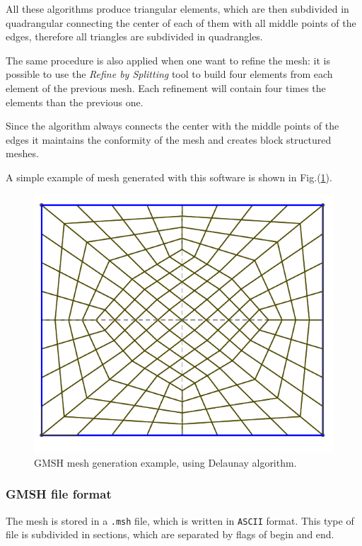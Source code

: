 All these algorithms produce triangular elements, which are then subdivided in quadrangular connecting the center of each of them with all middle points of the edges, therefore all triangles are subdivided in quadrangles.

The same procedure is also applied when one want to refine the mesh: it is possible to use the \textit{Refine by Splitting} tool to build four elements from each element of the previous mesh. Each refinement will contain four times the elements than the previous one.

Since the algorithm always connects the center with the middle points of the edges it maintains the conformity of the mesh and creates block structured meshes.

A simple example of mesh generated with this software is shown in Fig.(\ref{fig:simple_mesh}).

\begin{figure}
\centering
\includegraphics[scale=.6]{images/simple_mesh.pdf}
\caption{GMSH mesh generation example, using Delaunay algorithm.}
\label{fig:simple_mesh}
\end{figure}

\subsubsection{GMSH file format}\label{subsubsection:gmsh_format}
The mesh is stored in a \verb|.msh| file, which is written in \verb|ASCII| format. This type of file is subdivided in sections, which are separated by flags of begin and end.

